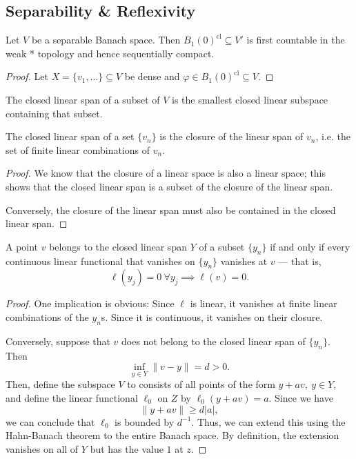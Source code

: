 \documentclass[twoside,symmetric, openany, 12pt]{./tuftebook}
\theoremstyle{definition}
\theoremstyle{definition}
\theoremstyle{definition}
\begin{document}
\subsection{Separability \& Reflexivity}
\begin{Theorem}
	Let $V$ be a separable Banach space. Then $B_1(0)^\text{cl}\subseteq V'$ is first countable in the weak * topology and hence sequentially compact. 
\end{Theorem}
\begin{proof}
	Let $X =\{v_1,\dots\} \subseteq V$ be dense and $\varphi\in B_1(0)^\text{cl}\subseteq V$.
	
\end{proof}
\begin{Definition}
	The closed linear span of a subset of $V$ is the smallest closed linear subspace containing that subset.
\end{Definition}
\begin{Lemma}
	The closed linear span of a set $\{v_n\} $ is the closure of the linear span of $v_n$, i.e. the set of finite linear combinations of $v_n$.
\end{Lemma}
\begin{proof}
	We know that the closure of a linear space is also a linear space; this shows that the closed linear span is a subset of the closure of the linear span.
	
	Conversely, the closure of the linear span must also be contained in the closed linear span.
\end{proof}
\begin{Theorem}\label{thm:spanningcriterion}
	A point $v$ belongs to the closed linear span $Y$ of a subset $\{y_n\} $ if and only if every continuous linear functional that vanishes on $\{y_n\} $ vanishes at $v$ --- that is,
	\[
	\ell(y_j)=0~\forall y_j\implies \ell(v)=0
	.\] 
\end{Theorem}
\begin{proof}
	One implication is obvious: Since $\ell$ is linear, it vanishes at finite linear combinations of the $y_n$s. Since it is continuous, it vanishes on their closure.  
	
	Conversely, suppose that $v$ does not belong to the closed linear span of $\{y_n\}$. Then 
	\[\inf_{y\in Y}\|v - y\| = d > 0.\]
	Then, define the subspace $V$ to consists of all points of the form $y+av,~y\in Y$, and define the linear functional $\ell_0$ on $Z$ by $\ell_0(y + av) = a$. Since we have
	\[\|y + av\| \ge d |a|,\]
	we can conclude that $\ell_0$ is bounded by $d^{-1}$. Thus, we can extend this using the Hahn-Banach theorem to the entire Banach space. By definition, the extension vanishes on all of $Y$ but has the value $1$ at $z$.
\end{proof}
\end{document}

